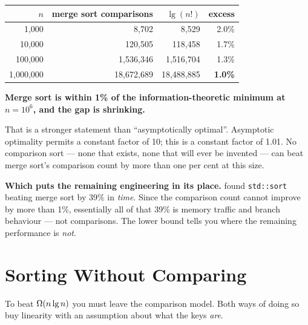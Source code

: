 \begin{worked}
\begin{center}
\begin{tabular}{@{}rrrr@{}}
\toprule
\rowcolor{primary!15}
$n$ & merge sort comparisons & $\lg(n!)$ & excess \\
\midrule
1{,}000     &       8{,}702 &       8{,}529 & 2.0\% \\
10{,}000    &     120{,}505 &     118{,}458 & 1.7\% \\
100{,}000   &   1{,}536{,}346 &   1{,}516{,}704 & 1.3\% \\
1{,}000{,}000 & 18{,}672{,}689 & 18{,}488{,}885 & \textbf{1.0\%} \\
\bottomrule
\end{tabular}
\end{center}

\smallskip
\textbf{Merge sort is within 1\% of the information-theoretic minimum at
$n = 10^{6}$, and the gap is shrinking.}

\smallskip
That is a stronger statement than ``asymptotically optimal''. Asymptotic
optimality permits a constant factor of 10; this is a constant factor of 1.01.
No comparison sort --- none that exists, none that will ever be invented ---
can beat merge sort's comparison count by more than one per cent at this size.

\smallskip
\textbf{Which puts the remaining engineering in its place.} 
found \texttt{std::sort} beating merge sort by 39\% in \emph{time}. Since the
comparison count cannot improve by more than 1\%, essentially all of that 39\%
is memory traffic and branch behaviour --- not comparisons. The lower bound
tells you where the remaining performance is \emph{not}.
\end{worked}

\section{Sorting Without Comparing}

To beat $\Omega(n\operatorname{lg} n)$ you must leave the comparison model. Both ways of
doing so buy linearity with an assumption about what the keys \emph{are}.


